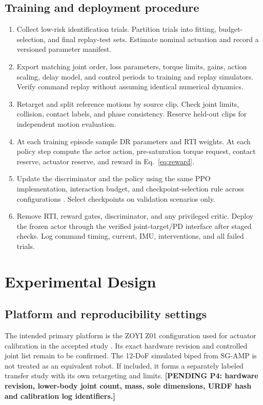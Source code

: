 \documentclass[11pt,a4paper]{article}
\newcommand{\pending}[1]{\textbf{[PENDING #1]}}
\begin{document}
\subsection{Training and deployment procedure}
\begin{enumerate}
\item Collect low-risk identification trials. Partition trials into fitting, budget-selection, and final replay-test sets. Estimate nominal actuation and record a versioned parameter manifest.
\item Export matching joint order, loss parameters, torque limits, gains, action scaling, delay model, and control periods to training and replay simulators. Verify command replay without assuming identical numerical dynamics.
\item Retarget and split reference motions by source clip. Check joint limits, collision, contact labels, and phase consistency. Reserve held-out clips for independent motion evaluation.
\item At each training episode sample DR parameters and RTI weights. At each policy step compute the actor action, pre-saturation torque request, contact reserve, actuator reserve, and reward in Eq.~\eqref{eq:reward}.
\item Update the discriminator and the policy using the same PPO implementation, interaction budget, and checkpoint-selection rule across configurations \cite{ppo}. Select checkpoints on validation scenarios only.
\item Remove RTI, reward gates, discriminator, and any privileged critic. Deploy the frozen actor through the verified joint-target/PD interface after staged checks. Log command timing, current, IMU, interventions, and all failed trials.
\end{enumerate}

\section{Experimental Design}
\subsection{Platform and reproducibility settings}
The intended primary platform is the ZOYI Z01 configuration used for actuator calibration in the accepted study \cite{priorRTI}. Its exact hardware revision and controlled joint list remain to be confirmed. The 12-DoF simulated biped from SG-AMP is not treated as an equivalent robot. If included, it forms a separately labeled transfer study with its own retargeting and limits. \pending{P4: hardware revision, lower-body joint count, mass, sole dimensions, URDF hash and calibration log identifiers.}
\end{document}
